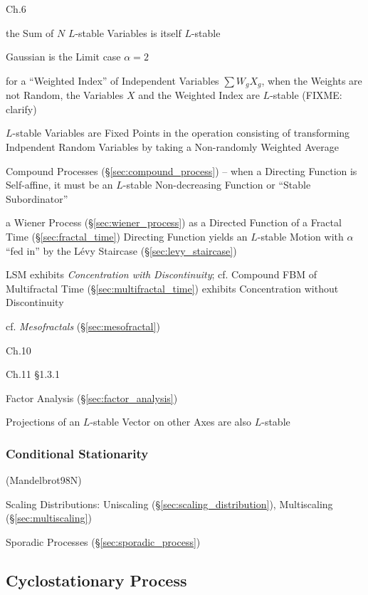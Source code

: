 Ch.6

the Sum of $N$ $L$-stable Variables is itself $L$-stable

Gaussian is the Limit case $\alpha = 2$

for a ``Weighted Index'' of Independent Variables $\sum W_g X_g$, when the
Weights are not Random, the Variables $X$ and the Weighted Index are $L$-stable
(FIXME: clarify)

$L$-stable Variables are Fixed Points in the operation consisting of
transforming Indpendent Random Variables by taking a Non-randomly Weighted
Average

Compound Processes (\S\ref{sec:compound_process}) -- when a Directing Function
is Self-affine, it must be an $L$-stable Non-decreasing Function or ``Stable
Subordinator''

a Wiener Process (\S\ref{sec:wiener_process}) as a Directed Function of a
Fractal Time (\S\ref{sec:fractal_time}) Directing Function yields an $L$-stable
Motion with $\alpha$ ``fed in'' by the L\'evy Staircase
(\S\ref{sec:levy_staircase})

LSM exhibits \emph{Concentration with Discontinuity}; cf. Compound FBM of
Multifractal Time (\S\ref{sec:multifractal_time}) exhibits Concentration without
Discontinuity

cf. \emph{Mesofractals} (\S\ref{sec:mesofractal})

Ch.10

Ch.11 \S 1.3.1

Factor Analysis (\S\ref{sec:factor_analysis})

Projections of an $L$-stable Vector on other Axes are also $L$-stable



\subsubsection{Conditional Stationarity}\label{sec:conditional_stationarity}

(Mandelbrot98N)

\fist Scaling Distributions: Uniscaling
(\S\ref{sec:scaling_distribution}), Multiscaling (\S\ref{sec:multiscaling})

\fist Sporadic Processes (\S\ref{sec:sporadic_process})



\subsection{Cyclostationary Process}\label{sec:cyclostationary_process}


